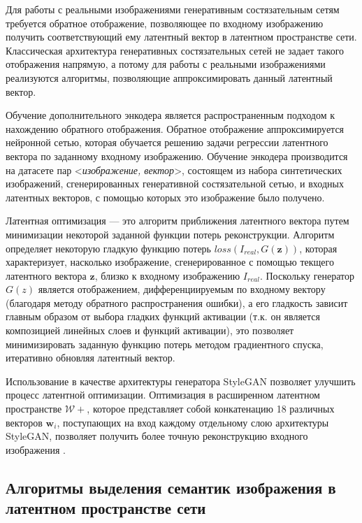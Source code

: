 Для работы с реальными изображениями генеративным состязательным сетям требуется обратное отображение, позволяющее по входному изображению получить соответствующий ему латентный вектор в латентном пространстве сети. 
Классическая архитектура генеративных состязательных сетей не задает такого отображения напрямую, а потому для работы с реальными изображениями реализуются алгоритмы, позволяющие аппроксимировать данный латентный вектор.

Обучение дополнительного энкодера \cite{donahue2016adversarial} является распространенным подходом к нахождению обратного отображения.
Обратное отображение аппроксимируется нейронной сетью, которая обучается решению задачи регрессии латентного вектора по заданному входному изображению. 
Обучение энкодера производится на датасете пар <\emph{изображение, вектор}>, состоящем из набора синтетических изображений, сгенерированных генеративной состязательной сетью, и входных латентных векторов, с помощью которых это изображение было получено.

Латентная оптимизация \cite{perarnau2016invertible} --- это алгоритм приближения латентного вектора путем минимизации некоторой заданной функции потерь реконструкции.
Алгоритм определяет некоторую гладкую функцию потерь $loss(I_{real}, G(\mathbf z)) $, которая характеризует, насколько изображение, сгенерированное с помощью текщего латентного вектора $\mathbf z$, близко к входному изображению $I_{real}$.
Поскольку генератор $G(z)$ является отображением, дифференциируемым по входному вектору (благодаря методу обратного распространения ошибки), а его гладкость зависит главным образом от выбора гладких функций активации (т.к. он является композицией линейных слоев и функций активации), это позволяет минимизировать заданную функцию потерь методом градиентного спуска, итеративно обновляя латентный вектор.

Использование в качестве архитектуры генератора StyleGAN позволяет улучшить процесс латентной оптимизации.
Оптимизация в расширенном латентном пространстве $\mathcal W+$, которое представляет собой конкатенацию 18 различных векторов $\mathbf w_i$, поступающих на вход каждому отдельному слою архитектуры StyleGAN, позволяет получить более точную реконструкцию входного изображения \cite{abdal2019image2stylegan}.


\subsection{Алгоритмы выделения семантик изображения в латентном пространстве сети}

